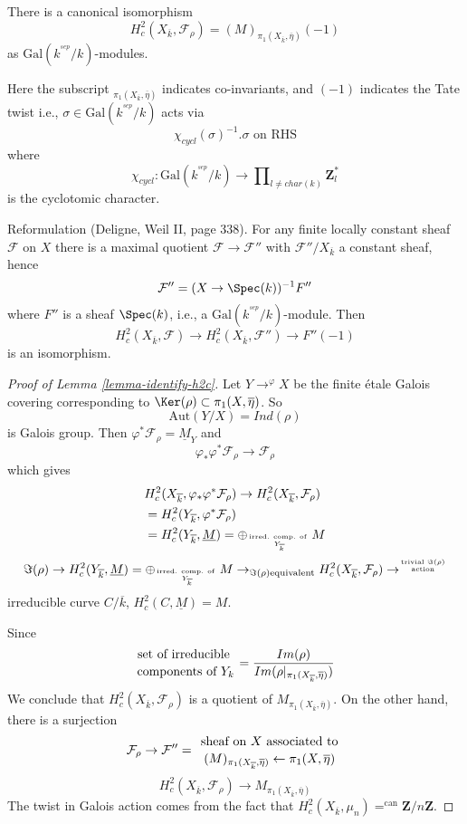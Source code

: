 \begin{lemma}
\label{lemma-identify-h2c}
There is a canonical isomorphism
$$
H_c^2(X_{\overline{k}}, \mathcal{F}_\rho)=(M)_{\pi_1(X_{\overline{k}},
\overline\eta)}(-1)
$$
as $\text{Gal}(k^{^{sep}}/k)$-modules.
\end{lemma}

\noindent
Here the subscript ${}_{\pi_1(X_{\overline{k}}, \overline\eta)}$
indicates co-invariants, and $(-1)$ indicates the Tate twist i.e.,
$\sigma\in \text{Gal}(k^{^{sep}}/k)$ acts via
$$
\chi_{cycl}(\sigma)^{-1}.\sigma\text{ on RHS}
$$
where
$$
\chi_{cycl} :
\text{Gal}(k^{^{sep}}/k)
\to
\prod\nolimits_{l\neq char(k)}\mathbf{Z}_l^*
$$
is the cyclotomic character.

\medskip\noindent
Reformulation (Deligne, Weil II, page 338). For any finite locally
constant sheaf $\mathcal{F}$ on $X$ there is a maximal quotient $\mathcal{F}\to
\mathcal{F}''$ with $\mathcal{F}''/X_{\overline{k}}$ a constant sheaf, hence
$$
\mathcal{F}'' = (X\to \Spec(k))^{-1}F''
$$
where $F''$ is a sheaf $\Spec(k)$, i.e., a
$\text{Gal}(k^{^{sep}}/k)$-module. Then
$$
H_c^2(X_{\overline{k}}, \mathcal{F})\to H_c^2(X_{\overline{k}},
\mathcal{F}'')\to F''(-1)
$$
is an isomorphism.

\begin{proof}[Proof of Lemma \ref{lemma-identify-h2c}]
Let $Y\to^{\varphi}X$ be the finite \'etale Galois covering
corresponding to $\Ker(\rho) \subset \pi_1(X, \overline\eta)$. So
$$
\text{Aut}(Y/X)=Ind(\rho)
$$
is Galois group. Then $\varphi^*\mathcal{F}_\rho =\underline M_Y$ and
$$
\varphi_*\varphi^*\mathcal{F}_\rho\to \mathcal{F}_\rho
$$
which gives
\begin{align*}
& H_c^2(X_{\overline{k}}, \varphi_*\varphi^*\mathcal{F}_\rho) \to
H_c^2(X_{\overline{k}}, \mathcal{F}_\rho)\\
& =H_c^2(Y_{\overline{k}}, \varphi^*\mathcal{F}_\rho)\\
& =H_c^2(Y_{\overline{k}}, \underline M) = \oplus_{\text{irred.
comp. of } \atop Y_{\overline{k}}}M
\end{align*}
$$
\Im(\rho) \to H_c^2(Y_{\overline{k}}, \underline M) =
\oplus_{\text{irred. comp. of } \atop Y_{\overline{k}}}
M \to_{\Im(\rho) \text{equivalent}} H_c^2(X_{\overline{k}},
\mathcal{F}_{\rho}) \to^{\text{trivial }
\Im(\rho) \atop \text{action}}
$$
irreducible curve $C/\overline{k}$, $H_c^2(C, \underline M)=M$.

\medskip\noindent
Since
$$
{\text{set of irreducible } \atop \text{components of }Y_k} =
\frac{Im(\rho)}{Im(\rho|_{\pi_1(X_{\overline{k}}, \overline \eta)})}
$$
We conclude that $H_c^2(X_{\overline{k}}, \mathcal{F}_\rho)$ is a
quotient of $M_{\pi_1(X_{\overline{k}}, \overline \eta)}$. On the other hand,
there is a surjection
$$
\mathcal{F}_\rho\to \mathcal{F}'' = {\text{ sheaf on }
X\text{ associated to } \atop (M)_{\pi_1(X_{\overline{k}}, \overline
\eta)}\leftarrow\pi_1(X, \overline \eta)}
$$
$$
H_c^2(X_{\overline{k}}, \mathcal{F}_\rho)\to
M_{\pi_1(X_{\overline{k}}, \overline\eta)}
$$
The twist in Galois action comes from the fact that
$H_c^2(X_{\overline{k}}, \mu_n)=^{\text{can}} \mathbf{Z}/n\mathbf{Z}$.
\end{proof}

